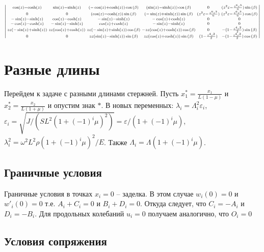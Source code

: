 \documentclass{article}
\begin{document}
$\begin{vsmallmatrix}
\cos(z)-\cosh(z) & \sin(z) - \sinh(z) & (-\cos(z)+\cosh(z))\cos{(\beta)} & (\sin(z) - \sinh(z))\cos{(\beta)} & 0 & (z^2 \varepsilon -\frac{z^6 \varepsilon^3}{6})\sin{(\beta)}\\
0 & 0 & (\cos(z)-\cosh(z))\sin{(\beta)} & (-\sin(z) + \sinh(z))\sin{(\beta)} & (z^2 \varepsilon -\frac{z^6 \varepsilon^3}{6}) & (z^2 \varepsilon -\frac{z^6 \varepsilon^3}{6}) \cos{(\beta)}\\
-\sin(z)-\sinh(z) & \cos(z) - \cosh(z) & -\sin(z)-\sinh(z) & -\cos(z) + \cosh(z) & 0 & 0 \\
-\cos(z)-\cosh(z) & -\sin(z) - \sinh(z) & \cos(z)+\cosh(z) & -\sin(z) - \sinh(z) & 0 & 0 \\
z \varepsilon(-\sin(z)+\sinh(z)) & z \varepsilon (\cos(z) + \cosh(z)) & z \varepsilon (-\sin(z)+\sinh(z)) \cos{(\beta)} & -z \varepsilon (\cos(z) + \cosh(z)) \cos{(\beta)}& 0 & -(1-\frac{z^4 \varepsilon^2}{2})\sin{(\beta)}\\
0 & 0 & z \varepsilon (\sin(z)-\sinh(z)) \sin{(\beta)} & z \varepsilon (\cos(z) + \cosh(z)) \sin{(\beta)} & (1-\frac{z^4 \varepsilon^2}{2}) & -(1-\frac{z^4 \varepsilon^2}{2})\cos{(\beta)}
\end{vsmallmatrix}$

\section{Разные длины}
Перейдем к задаче с разными длинами стержней. Пусть $x_1^*=\frac{x_1}{L(1-\mu)}$ и $x_2^*=\frac{x_2}{L(1+\mu)}$ и опустим знак $*$. В новых переменных: $\lambda_i=\Lambda_i^2 \varepsilon_i$, $\varepsilon_i = \sqrt{J/(SL^2(1+(-1)^i \mu)^2)} = \varepsilon / (1+(-1)^i \mu) $, $\lambda_i^2=\omega^2L^2 \rho (1+(-1)^i\mu)^2/E$. Также $\Lambda_i=\Lambda(1+(-1)^i\mu)$.

\subsection{Граничные условия}

Граничные условия в точках $x_i = 0$ -- заделка. В этом случае $w_i (0)=0$ и $w'_i (0) = 0$ т.е. $A_i + C_i = 0$ и $B_i + D_i = 0$. Откуда следует, что $C_i = -A_i$ и $D_i = -B_i$. Для продольных колебаний $u_i=0$ получаем аналогично, что $O_i=0$

\subsection{Условия сопряжения}
\end{document}
